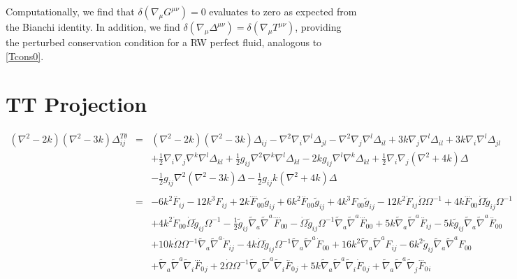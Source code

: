 \documentclass[10pt,letterpaper]{article}
\numberwithin{equation}{section}
\begin{document}
Computationally, we find that $\delta(\nabla_\mu G^{\mu \nu})=0$ evaluates to zero as expected from the Bianchi identity. In addition, we find $\delta(\nabla_\mu \Delta^{\mu \nu})=\delta(\nabla_\mu T^{\mu \nu})$, providing the perturbed conservation condition for a RW perfect fluid, analogous to \eqref{Tcons0}. 
%
%
%
%
\section{TT Projection}
\begin{eqnarray}
(\nabla^2-2k)(\nabla^2-3k)\Delta_{ij}^{T\theta}&=&
(\nabla^2-2k)(\nabla^2-3k)\Delta_{ij}-\nabla^2 \nabla_i \nabla^l \Delta_{jl} - \nabla^2 \nabla_j \nabla^l \Delta_{il}+3k\nabla_j \nabla^l \Delta_{il}+3k\nabla_i \nabla^l \Delta_{jl}
\nonumber\\
&&+\tfrac12 \nabla_i\nabla_j \nabla^k \nabla^l \Delta_{kl}+\tfrac12 g_{ij} \nabla^2 \nabla^k \nabla^l \Delta_{kl}
-2k g_{ij} \nabla^l \nabla^k \Delta_{kl}+ \tfrac12 \nabla_i \nabla_j (\nabla^2+4k)\Delta
\nonumber\\
&& -\tfrac12 g_{ij}\nabla^2(\nabla^2-3k)\Delta-\tfrac12 g_{ij} k (\nabla^2+4k)\Delta
\\ \nonumber\\ 
&=&-6 k^2 \overset{..}{F}_{ij} - 12 k^3 F_{ij} + 2 k \overset{....}{F}_{00}{} \tilde{g}_{ij} + 6 k^2 \overset{..}{F}_{00}{} \tilde{g}_{ij} + 4 k^3 F_{00}{} \tilde{g}_{ij} - 12 k^2 \dot{F}_{ij} \dot{\Omega} \Omega^{-1} + 4 k \overset{...}{F}_{00}{} \dot{\Omega} \tilde{g}_{ij} \Omega^{-1} \nonumber \\ 
&& + 4 k^2 \dot{F}_{00}{} \dot{\Omega} \tilde{g}_{ij} \Omega^{-1} -  \tfrac{1}{2} \tilde{g}_{ij} \tilde{\nabla}_{a}\tilde{\nabla}^{a}\overset{....}{F}_{00}{} -  \dot{\Omega} \tilde{g}_{ij} \Omega^{-1} \tilde{\nabla}_{a}\tilde{\nabla}^{a}\overset{...}{F}_{00}{} + 5 k \tilde{\nabla}_{a}\tilde{\nabla}^{a}\overset{..}{F}_{ij} - 5 k \tilde{g}_{ij} \tilde{\nabla}_{a}\tilde{\nabla}^{a}\overset{..}{F}_{00}{} \nonumber \\ 
&& + 10 k \dot{\Omega} \Omega^{-1} \tilde{\nabla}_{a}\tilde{\nabla}^{a}\dot{F}_{ij} - 4 k \dot{\Omega} \tilde{g}_{ij} \Omega^{-1} \tilde{\nabla}_{a}\tilde{\nabla}^{a}\dot{F}_{00}{} + 16 k^2 \tilde{\nabla}_{a}\tilde{\nabla}^{a}F_{ij} - 6 k^2 \tilde{g}_{ij} \tilde{\nabla}_{a}\tilde{\nabla}^{a}F_{00}{} \nonumber \\ 
&& + \tilde{\nabla}_{a}\tilde{\nabla}^{a}\tilde{\nabla}_{i}\overset{...}{F}_{0}{}_{j} + 2 \dot{\Omega} \Omega^{-1} \tilde{\nabla}_{a}\tilde{\nabla}^{a}\tilde{\nabla}_{i}\overset{..}{F}_{0}{}_{j} + 5 k \tilde{\nabla}_{a}\tilde{\nabla}^{a}\tilde{\nabla}_{i}\dot{F}_{0}{}_{j} + \tilde{\nabla}_{a}\tilde{\nabla}^{a}\tilde{\nabla}_{j}\overset{...}{F}_{0}{}_{i} \nonumber \\ 

\end{eqnarray}
\end{document}
